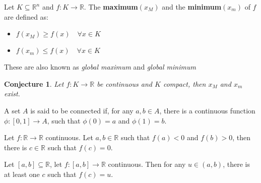 \documentclass[aspectratio=169, handout]{beamer}
\newtheorem{proposition}{Conjecture}[section]
\begin{document}
\begin{frame}
    \begin{definition}
        Let $K\subseteq\mathds{R}^n$ and $f:K\rightarrow\mathds{R}$. The \textbf{maximum}$(x_M)$ and the \textbf{minimum}$(x_m)$ of $f$ are defined as:
        \begin{itemize}
            \item $f(x_M)\geq f(x) \quad \forall x\in K$
            \item $f(x_m)\leq f(x) \quad \forall x\in K$
        \end{itemize}
        
        These are also known as \emph{global maximum} and \emph{global minimum}
    \end{definition}
    
    \begin{proposition}
        Let $f:K\rightarrow\mathds{R}$ be continuous and $K$ compact, then $x_M$ and $x_m$ exist.
    \end{proposition}
\end{frame}

\begin{frame}
    \begin{definition}
        A set $A$ is said to be connected if, for any $a,b\in A$, there is a continuous function $\phi:[0,1]\rightarrow A$, such that $\phi(0)=a$ and $\phi(1)=b$.
    \end{definition}

    \begin{theorem}[Bolzano]
        Let $f:\mathds{R}\rightarrow\mathds{R}$ continuous. Let $a,b\in\mathds{R}$ such that $f(a)<0$ and $f(b)>0$, then there is $c\in\mathds{R}$ such that $f(c)=0$.
    \end{theorem}
    
    \begin{theorem}[Weierstrass]
        
        Let $[a,b]\subseteq\mathds{R}$, let $f:[a,b]\rightarrow\mathds{R}$ continuous. Then for any $u\in(a,b)$, there is at least one $c$ such that $f(c)=u.$
        
    \end{theorem}
\end{frame}
\end{document}
